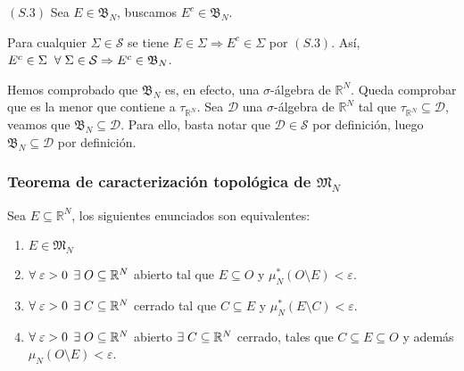 \documentclass[12pt,a4paper]{article}
\newcommand{\R}{\mathbb{R}}
\newcounter{unit}[section]
\newcounter{chapter}[unit]
\renewcommand{\theunit}{\arabic{unit}}
\renewcommand{\thechapter}{\arabic{chapter}}
\renewcommand{\thesubsubsection}{\theunit.\thechapter.\arabic{subsubsection}}
\newcommand{\result}[1]{%
  \subsubsection{#1}%
  \label{result:\thesubsubsection}
}
\begin{document}
\vspace{3mm}
\noindent $(S.3)$ Sea $E \in \mathfrak{B}_N$, buscamos $E^c \in \mathfrak{B}_N$.
\begin{adjustwidth}{0.07\textwidth}{}
    Para cualquier $\Sigma \in \mathcal{S}$ se tiene $E \in \Sigma \Rightarrow E^c \in \Sigma$ \hspace{1mm} por $(S.3)$.
    \newline Así, $E^c \in \Sigma \hspace{2mm} \forall \hspace{1mm} \Sigma \in \mathcal{S} \Rightarrow E^c \in \mathfrak{B}_N$.
\end{adjustwidth}

\vspace{4mm}
Hemos comprobado que $\mathfrak{B}_N$ es, en efecto, una $\sigma$-álgebra de $\R^N$. Queda comprobar que es la menor que contiene a $\tau_{\R^N}$. Sea $\mathcal{D}$ una $\sigma$-álgebra de $\R^N$ tal que $\tau_{\R^N} \subseteq \mathcal{D}$, veamos que $\mathfrak{B}_N \subseteq \mathcal{D}$.
Para ello, basta notar que $\mathcal{D} \in \mathcal{S}$ por definición, luego $\mathfrak{B}_N \subseteq \mathcal{D}$ por definición.

\vspace{6mm}
\result{Teorema de caracterización topológica de \texorpdfstring{$\mathfrak{M}_N$}{M\_N}}
\hspace{3mm} Sea $E \subseteq \R^N$, los siguientes enunciados son equivalentes:
\begin{enumerate}[label=\roman*)]
    \item $E \in \mathfrak{M}_N$
    \item $\forall \hspace{1mm} \varepsilon > 0$ $\exists \hspace{1mm} O \subseteq \R^N$ abierto tal que $E \subseteq O$ y $\mu_N^*(O \setminus E) < \varepsilon$.
    \item $\forall \hspace{1mm} \varepsilon > 0$ $\exists \hspace{1mm} C \subseteq \R^N$ cerrado tal que $C \subseteq E$ y $\mu_N^*(E \setminus C) < \varepsilon$.
    \item $\forall \hspace{1mm} \varepsilon > 0$ $\exists \hspace{1mm} O \subseteq \R^N$ abierto $\exists \hspace{1mm} C \subseteq \R^N$ cerrado, tales que $C \subseteq E \subseteq O$ y además $\mu_N(O\setminus E) < \varepsilon$.
\end{enumerate}
\end{document}
